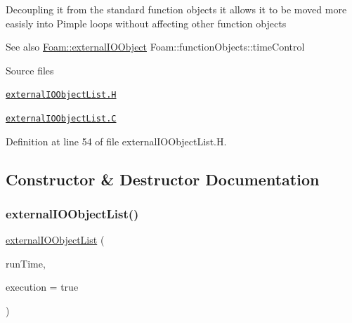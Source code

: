 \label{_Description}%
 Decoupling it from the standard function objects it allows it to be moved more easisly into Pimple loops without affecting other function objects

\begin{DoxySeeAlso}{See also}
\hyperlink{classFoam_1_1externalIOObject}{Foam\+::external\+I\+O\+Object} Foam\+::function\+Objects\+::time\+Control
\end{DoxySeeAlso}
\begin{DoxyParagraph}{Source files}

\begin{DoxyItemize}
\item \href{../../../home/carlo/data/GeN-Foam/GeN-Foam_ffn/GeN-Foam/GeN-Foam/FMU4FOAM/ECI4FOAM/src/externalComm/externalIO/externalIOObjectList.H}{\tt external\+I\+O\+Object\+List.\+H} 
\item \href{../../../home/carlo/data/GeN-Foam/GeN-Foam_ffn/GeN-Foam/GeN-Foam/FMU4FOAM/ECI4FOAM/src/externalComm/externalIO/externalIOObjectList.C}{\tt external\+I\+O\+Object\+List.\+C} 
\end{DoxyItemize}
\end{DoxyParagraph}


Definition at line 54 of file external\+I\+O\+Object\+List.\+H.



\subsection{Constructor \& Destructor Documentation}
\mbox{\label{classFoam_1_1externalIOObjectList_aae6d9ceeaff8a694fb2137220c41118a}} 
\subsubsection{\texorpdfstring{external\+I\+O\+Object\+List()}{externalIOObjectList()}}
{\footnotesize\ttfamily \hyperlink{classFoam_1_1externalIOObjectList}{external\+I\+O\+Object\+List} (\begin{DoxyParamCaption}\item[{const Time \&}]{run\+Time,  }\item[{const bool}]{execution = {\ttfamily true} }\end{DoxyParamCaption})}



